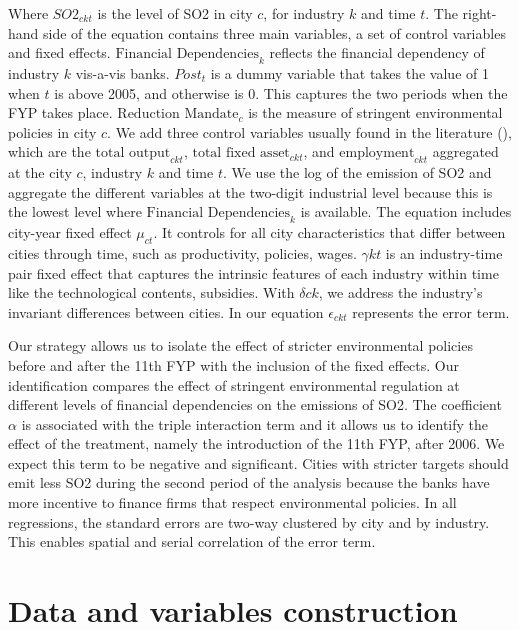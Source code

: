 \documentclass[12pt]{article}
\begin{document}
Where $SO2_{ckt}$ is the level of SO2 in city $c$, for industry $k$ and time $t$. The right-hand side of the equation contains three main variables, a set of control variables and fixed effects. $\text{Financial Dependencies}_{k}$ reflects the financial dependency of industry $k$ vis-a-vis banks. $Post_t$ is a dummy variable that takes the value of 1 when $t$ is above 2005, and otherwise is 0. This captures the two periods when the FYP takes place. $\text{Reduction Mandate}_{c}$ is the measure of stringent environmental policies in city $c$. We add three control variables usually found in the literature (\cite{Andersen2015-pa, Andersen2017-wf}), which are the $\text{total output}_{ckt}$, $\text{total fixed asset}_{ckt}$, and $\text{employment}_{ckt}$ aggregated at the city $c$, industry $k$ and time $t$. We use the log of the emission of SO2 and aggregate the different variables at the two-digit industrial level because this is the lowest level where $\text{Financial Dependencies}_{k}$ is available. The equation includes city-year fixed effect $\mu_{ct}$. It controls for all city characteristics that differ between cities through time, such as productivity, policies, wages. $\gamma{kt}$ is an industry-time pair fixed effect that captures the intrinsic features of each industry within time like the technological contents, subsidies. With $\delta{ck}$, we address the industry's invariant differences between cities. In our equation $\epsilon_{ckt}$ represents the error term.

Our strategy allows us to isolate the effect of stricter environmental policies before and after the 11th FYP with the inclusion of the fixed effects. Our identification compares the effect of stringent environmental regulation at different levels of financial dependencies on the emissions of SO2. The coefficient $\alpha$ is associated with the triple interaction term and it allows us to identify the effect of the treatment, namely the introduction of the 11th FYP, after 2006. We expect this term to be negative and significant. Cities with stricter targets should emit less SO2 during the second period of the analysis because the banks have more incentive to finance firms that respect environmental policies. In all regressions, the standard errors are two-way clustered by city and by industry. This enables spatial and serial correlation of the error term.

\section{Data and variables construction} \label{sec:Data}
\end{document}
